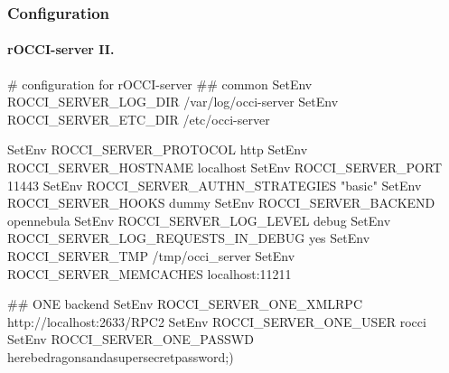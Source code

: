 \begin{frame}[fragile]
  \frametitle{Configuration}
  \framesubtitle{rOCCI-server II.}

\begin{terminalbox}{\Fonttiny}
# configuration for rOCCI-server
## common
SetEnv ROCCI_SERVER_LOG_DIR /var/log/occi-server
SetEnv ROCCI_SERVER_ETC_DIR /etc/occi-server

SetEnv ROCCI_SERVER_PROTOCOL              http
SetEnv ROCCI_SERVER_HOSTNAME              localhost
SetEnv ROCCI_SERVER_PORT                  11443
SetEnv ROCCI_SERVER_AUTHN_STRATEGIES      "basic"
SetEnv ROCCI_SERVER_HOOKS                 dummy
SetEnv ROCCI_SERVER_BACKEND               opennebula
SetEnv ROCCI_SERVER_LOG_LEVEL             debug
SetEnv ROCCI_SERVER_LOG_REQUESTS_IN_DEBUG yes
SetEnv ROCCI_SERVER_TMP                   /tmp/occi_server
SetEnv ROCCI_SERVER_MEMCACHES             localhost:11211

## ONE backend
SetEnv ROCCI_SERVER_ONE_XMLRPC  http://localhost:2633/RPC2
SetEnv ROCCI_SERVER_ONE_USER    rocci
SetEnv ROCCI_SERVER_ONE_PASSWD  herebedragonsandasupersecretpassword;)
\end{terminalbox}
\end{frame}
